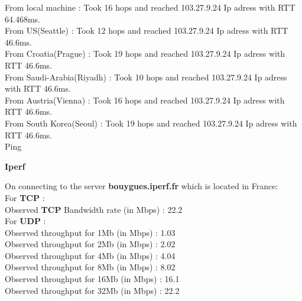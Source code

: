 \documentclass{article}
\theoremstyle{remark}
\newcommand{\tbf}[1]{\textbf{#1}}
\begin{document}
From local machine           : Took 16 hops and reached 103.27.9.24 Ip adress with RTT 64.468ms.\\
From US(Seattle)           : Took 12 hops and reached 103.27.9.24 Ip adress with RTT 46.6ms. \\
From Croatia(Prague)         : Took 19 hops and reached 103.27.9.24 Ip adress with RTT 46.6ms.  \\
From Saudi-Arabia(Riyadh)  : Took 10 hops and reached 103.27.9.24 Ip adress with RTT 46.6ms. \\
From Austria(Vienna)       : Took 16 hops and reached 103.27.9.24 Ip adress with RTT 46.6ms. \\
From South Korea(Seoul)      : Took 19 hops and reached 103.27.9.24 Ip adress with RTT 46.6ms.\\  



\large{Ping}

\begin{table}[H]
    \centering
    \caption{Ping Data}
    \label{Table 1:}
\end{table}

\tbf{\large{Iperf}}\\

\normalsize

On connecting to the server \tbf{bouygues.iperf.fr} which is located in France: \\
For \tbf{TCP} : \\
Observed \tbf{TCP} Bandwidth rate (in Mbps) : 22.2  \\
For \tbf{UDP} :\\
Observed throughput for 1Mb  (in Mbps) : 1.03 \\
Observed throughput for 2Mb  (in Mbps) : 2.02 \\
Observed throughput for 4Mb  (in Mbps) : 4.04 \\
Observed throughput for 8Mb  (in Mbps) : 8.02 \\
Observed throughput for 16Mb (in Mbps) : 16.1 \\
Observed throughput for 32Mb (in Mbps) : 22.2 \\
\end{document}
